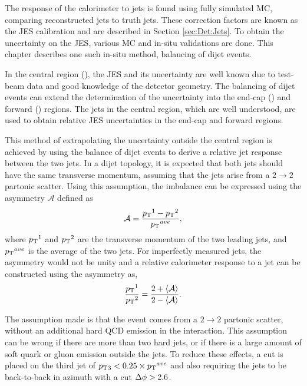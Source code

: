 The response of the calorimeter to jets is found using fully simulated MC, comparing reconstructed jets to truth jets.
These correction factors are known as the JES calibration and are described in Section \ref{sec:Det:Jets}. 
To obtain the uncertainty on the JES, various MC and in-situ validations are done.
This chapter describes one such in-situ method, \pt{} balancing of dijet events. 

In the central region (), the JES and its uncertainty  are well known due to test-beam data and good knowledge of the detector geometry.
The \pt{} balancing of dijet events can extend the determination of the uncertainty into the end-cap () and forward () regions. 
The jets in the central region, which are well understood, are used to obtain relative JES uncertainties in the end-cap and forward regions. 

This method of extrapolating the uncertainty outside the central region is achieved by using the \pt{} balance of dijet events to derive a relative jet response between the two jets.
In a dijet topology, it is expected that both jets should have the same transverse momentum, assuming that the jets arise from a $2\rightarrow2$ partonic scatter.
Using this assumption, the \pt{} imbalance can be expressed using the asymmetry $\mathcal{A}$ defined as
\begin{equation}
\mathcal{A} =\frac{\mbox{$p_{\rm T}$}{}^1 - \mbox{$p_{\rm T}$}{}^2}{\mbox{$\mbox{$p_{\rm T}$}{}^{ave}$}{}},
\label{JetPerf:Assym}
\end{equation}
where $\mbox{$p_{\rm T}$}{}^1$ and $\mbox{$p_{\rm T}$}{}^2$ are the transverse momentum of the two leading jets, and $\mbox{$\mbox{$p_{\rm T}$}{}^{ave}$}{}$ is the average \pt{} of the two jets.
For imperfectly measured jets, the asymmetry would not be unity and a relative calorimeter response to a jet can be constructed using the asymmetry as,
\begin{equation}
 \frac{\mbox{$p_{\rm T}$}{}^1}{\mbox{$p_{\rm T}$}{}^2}=\frac{2+\mbox{$\langle \mathcal{A} \rangle$}}{2-\mbox{$\langle \mathcal{A} \rangle$}}.
\label{JetPerf:JetResp}
\end{equation}

The assumption made is that the event comes from a $2\rightarrow2$ partonic scatter, without an additional hard QCD emission in the interaction.
This assumption can be wrong if there are more than two hard jets, or if there is a large amount of soft quark or gluon emission outside the jets. 
To reduce these effects, a cut is placed on the third jet \pt{} of $\mbox{$p_{\rm T}$}{}_3<0.25\times\mbox{$\mbox{$p_{\rm T}$}{}^{ave}$}{}$ and also requiring the jets to be back-to-back in azimuth with a cut $\mbox{$\Delta{\rm \phi}$}{}>2.6$.
 

